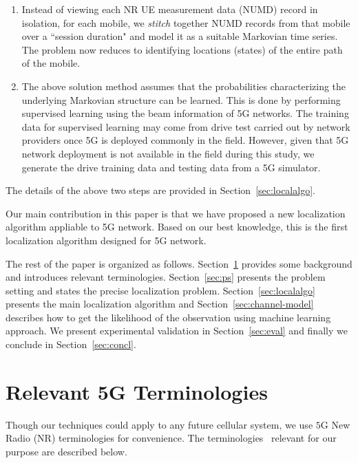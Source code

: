 \documentclass[conference, 10pt]{IEEEtran}
\begin{document}
\begin{enumerate}
    \item Instead of viewing each NR UE measurement data (NUMD) record in isolation, for each mobile, we {\em stitch}
together NUMD records from that mobile over a ``session
duration"  and model it as a suitable Markovian time series. The problem now
reduces to identifying locations (states) of the entire path of
the mobile.

\item The above solution method assumes that the probabilities characterizing the
underlying Markovian structure can be learned. This is done by performing supervised learning using the beam information of 5G networks.
The training data for supervised learning may come from
drive test carried out by network providers once 5G is deployed commonly in the field. However, given that 5G network deployment is not available in the field during this study, we generate the drive training data and testing data from a 5G simulator.
	
\end{enumerate}

The details of the above two steps are provided in Section~\ref{sec:localalgo}.


Our main contribution in this paper is that we have proposed a new localization algorithm
appliable to 5G network. Based on our best knowledge, this is the first localization algorithm designed for 5G network. 


The rest of the paper is organized as follows. Section~\ref{sec:bg} provides some
background and introduces relevant terminologies. Section~\ref{sec:ps} presents
the problem setting and states the precise localization problem.
Section~\ref{sec:localalgo}
presents the main localization algorithm and Section~\ref{sec:channel-model} describes how to get the likelihood of the observation using machine learning approach. 
We present experimental validation in Section~\ref{sec:eval} and finally we conclude in
Section~\ref{sec:concl}.




\section{Relevant 5G Terminologies}
\label{sec:bg}
Though our techniques could apply to any future cellular system, we use $5$G New Radio (NR) 
terminologies for convenience. The terminologies~\cite{3gpp38series} relevant for our purpose are described below.
\end{document}
